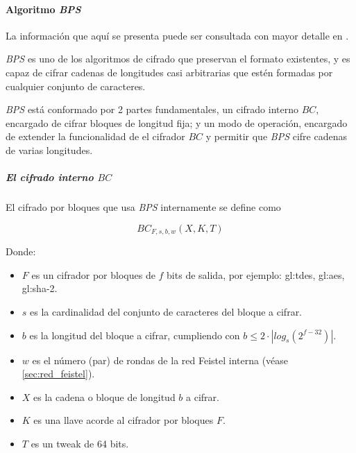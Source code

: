 %
%

\paragraph{Algoritmo \textit{BPS}}

La información que aquí se presenta puede ser consultada con mayor detalle en
\cite{bps}.

\textit{BPS} es uno de los algoritmos de cifrado que preservan el formato 
existentes, y es capaz de cifrar cadenas de longitudes casi arbitrarias que 
estén formadas por cualquier conjunto de caracteres.

\textit{BPS} está conformado por 2 partes fundamentales, un cifrado interno 
$BC$, encargado de cifrar bloques de longitud fija; y un modo de operación, 
encargado de extender la funcionalidad de el cifrador $BC$ y permitir que 
\textit{BPS} cifre cadenas de varias longitudes.


\subparagraph{El cifrado interno $BC$}


El cifrado por bloques que usa \textit{BPS} internamente se define como 

\begin{equation}
  BC_{F,s,b,w}(X,K,T)
\end{equation}

Donde:
\begin{itemize}
  \item $F$ es un cifrador por bloques de $f$ bits de salida,
    por ejemplo: \gls{gl:tdes}, \gls{gl:aes}, \gls{gl:sha}-2.
  \item $s$ es la cardinalidad del conjunto de caracteres del bloque a cifrar.
  \item $b$ es la longitud del bloque a cifrar, 
    cumpliendo con $b \leq 2 \cdot |log_s(2^{f-32})|$.
  \item $w$ es el número (par) de rondas de la red Feistel interna 
    (véase \ref{sec:red_feistel}).
  \item $X$ es la cadena o bloque de longitud $b$ a cifrar.
  \item $K$ es una llave acorde al cifrador por bloques $F$.
  \item $T$ es un tweak de 64 bits.
\end{itemize}

